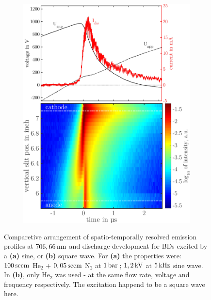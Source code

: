 \documentclass[a4paper,10pt,twoside]{article}
\newcommand{\fett}[1]{\textbf{#1}}
\begin{document}
\begin{figure}
\begin{subfigure}[t]{0.49\textwidth}
						\includegraphics[width=\textwidth]{figures/706nm@square/combination.pdf}
						\caption{}
						\label{img:combsquare}
					\end{subfigure}
					
					
					\caption{Comparetive arrangement of spatio-temporally resolved emission profiles at $\unit[706,66]{nm}$ and discharge development for BDs excited by a \fett{(a)} sine, or \fett{(b)} square wave. For \fett{(a)} the properties were: $\unit[100]{sccm}$ He$_2$ + $\unit[0,05]{sccm}$ N$_2$ at $\unit[1]{bar}$\,; $\unit[1,2]{kV}$ at $\unit[5]{kHz}$ sine wave. In \fett{(b)}, only He$_2$ was used - at the same flow rate, voltage and frequency respectively. The excitation happend to be a square wave here.}
					\label{img:comparisonsinesquare}
				\end{figure}
				
\end{document}
